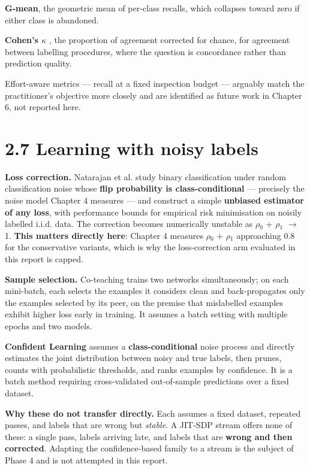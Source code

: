 \textbf{G-mean}, the geometric mean of per-class recalls, which
collapses toward zero if either class is abandoned.

\textbf{Cohen's \ensuremath{\kappa}} \citep{cohen1960kappa}, the proportion of agreement
corrected for chance, for agreement between labelling procedures, where
the question is concordance rather than prediction quality.

Effort-aware metrics --- recall at a fixed inspection budget ---
arguably match the practitioner's objective more closely and are
identified as future work in Chapter 6, not reported here.

\section{2.7 Learning with noisy
labels}\label{learning-with-noisy-labels}

\textbf{Loss correction.} Natarajan et al. \citep{natarajan2013noisy}
study binary classification under random classification noise whose
\textbf{flip probability is class-conditional} --- precisely the noise
model Chapter 4 measures --- and construct a simple \textbf{unbiased
estimator of any loss}, with performance bounds for empirical risk
minimisation on noisily labelled i.i.d. data. The correction becomes
numerically unstable as \ensuremath{\rho}\ensuremath{_0} + \ensuremath{\rho}\ensuremath{_1} \ensuremath{\rightarrow} 1. \textbf{This matters directly
here}: Chapter 4 measures \ensuremath{\rho}\ensuremath{_0} + \ensuremath{\rho}\ensuremath{_1} approaching 0.8 for the conservative
variants, which is why the loss-correction arm evaluated in this report
is capped.

\textbf{Sample selection.} Co-teaching \citep{han2018coteaching} trains
two networks simultaneously; on each mini-batch, each selects the
examples it considers clean and back-propagates only the examples
selected by its peer, on the premise that mislabelled examples exhibit
higher loss early in training. It assumes a batch setting with multiple
epochs and two models.

\textbf{Confident Learning} \citep{northcutt2021confident} assumes a
\textbf{class-conditional} noise process and directly estimates the
joint distribution between noisy and true labels, then prunes, counts
with probabilistic thresholds, and ranks examples by confidence. It is a
batch method requiring cross-validated out-of-sample predictions over a
fixed dataset.

\textbf{Why these do not transfer directly.} Each assumes a fixed
dataset, repeated passes, and labels that are wrong but \emph{stable}. A
JIT-SDP stream offers none of these: a single pass, labels arriving
late, and labels that are \textbf{wrong and then corrected}. Adapting
the confidence-based family to a stream is the subject of Phase 4 and is
not attempted in this report.

